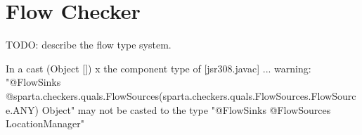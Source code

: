 \htmlhr
\chapter{Flow Checker\label{flow-checker}}

TODO: describe the flow type system.


In a cast \<(Object []) x\> the component type of 
[jsr308.javac] ... warning: "@FlowSinks @sparta.checkers.quals.FlowSources({sparta.checkers.quals.FlowSources.FlowSource.ANY}) Object" may not be casted to the type "@FlowSinks @FlowSources LocationManager"
